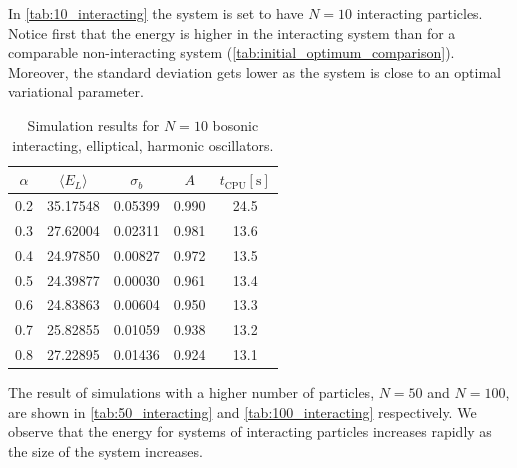 \documentclass[
    a4paper, aps, twocolumn, floatfix, superscriptaddress, nofootinbib]{revtex4-1}
\newcommand{\1}{\mathds{1}}
\begin{document}
        In \autoref{tab:10_interacting} the system is set to have $N = 10$
        interacting particles. Notice first that the energy is higher in
        the interacting system than for a comparable non-interacting system
        (\autoref{tab:initial_optimum_comparison}).  Moreover, the standard
        deviation gets lower as the system is close to an optimal variational
        parameter.

        \begin{table}
            \caption{Simulation results for $N = 10$ bosonic interacting,
            elliptical, harmonic oscillators.}
            \centering
            \begin{ruledtabular}
                \begin{tabular}{ccccc}
                    $\alpha$ & $\langle  E_L\rangle$ & $\sigma_b$
                    &$A$ & $t_{\text{CPU}} [\si{\second}]$ \\
                    \hline
                    0.2&35.17548&0.05399&0.990%
                    &24.5\\%
                    0.3&27.62004&0.02311&0.981%
                    &13.6\\%
                    0.4&24.97850&0.00827&0.972%
                    &13.5\\%
                    0.5&24.39877&0.00030&0.961%
                    &13.4\\%
                    0.6&24.83863&0.00604&0.950%
                    &13.3\\%
                    0.7&25.82855&0.01059&0.938%
                    &13.2\\%
                    0.8&27.22895&0.01436&0.924%
                    &13.1\\%
                \end{tabular}
            \end{ruledtabular}
            \label{tab:10_interacting}
        \end{table}

        The result of simulations with a higher number of particles, $N=50$ and
        $N=100$, are  shown in \autoref{tab:50_interacting} and
        \autoref{tab:100_interacting} respectively. We observe that the energy
        for systems of interacting particles increases rapidly as the size of
        the system increases.
\end{document}
